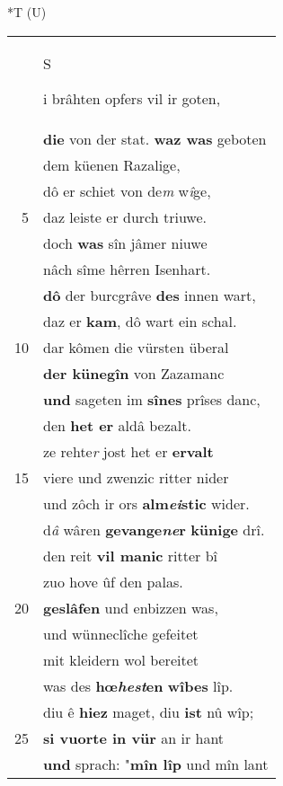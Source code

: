 \documentclass[8pt,a4paper,notitlepage]{article}
\begin{document}
\begin{table}[ht]
\begin{minipage}[t]{0.5\linewidth}
\end{minipage}
\hspace{0.5cm}
\begin{minipage}[t]{0.5\linewidth}
\small
\begin{center}*T (U)
\end{center}
\begin{tabular}{rl}
 & \begin{large}S\end{large}i brâhten opfers vil ir goten,\\ 
 & \textbf{die} von der stat. \textbf{waz was} geboten\\ 
 & dem küenen Razalige,\\ 
 & dô er schiet von de\textit{m} w\textit{î}ge,\\ 
5 & daz leiste er durch triuwe.\\ 
 & doch \textbf{was} sîn jâmer niuwe\\ 
 & nâch sîme hêrren Isenhart.\\ 
 & \textbf{dô} der burcgrâve \textbf{des} innen wart,\\ 
 & daz er \textbf{kam}, dô wart ein schal.\\ 
10 & dar kômen die vürsten überal\\ 
 & \textbf{der künegîn} von Zazamanc\\ 
 & \textbf{und} sageten im \textbf{sînes} prîses danc,\\ 
 & den \textbf{het er} aldâ bezalt.\\ 
 & ze rehte\textit{r} jost het er \textbf{ervalt}\\ 
15 & viere und zwenzic ritter nider\\ 
 & und zôch ir ors \textbf{alm\textit{ei}stic} wider.\\ 
 & d\textit{â} wâren \textbf{gevange\textit{ne}r} \textbf{künige} drî.\\ 
 & den reit \textbf{vil manic} ritter bî\\ 
 & zuo hove ûf den palas.\\ 
20 & \textbf{geslâfen} und enbizzen was,\\ 
 & und wünneclîche gefeitet\\ 
 & mit kleidern wol bereitet\\ 
 & was des \textbf{hœ\textit{hest}en} \textbf{wîbes} lîp.\\ 
 & diu ê \textbf{hiez} maget, diu \textbf{ist} nû wîp;\\ 
25 & \textbf{si vuorte in vür} an ir hant\\ 
 & \textbf{und} sprach: "\textbf{mîn lîp} und mîn lant\\ 

\end{tabular}
\end{minipage}
\end{table}
\end{document}

